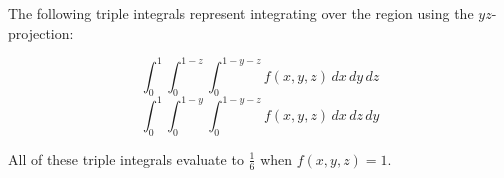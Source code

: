 \documentclass{amsart}
\newcommand{\ds}{\displaystyle}
\theoremstyle{definition}
\begin{document}
The following triple integrals represent integrating over the region using the $yz$-projection:

\[\int_{0}^{1}\int_{0}^{1-z}\int_{0}^{1-y-z} f(x,y,z) \,dx \,dy \,dz\]
\[\int_{0}^{1}\int_{0}^{1-y}\int_{0}^{1-y-z} f(x,y,z) \,dx \,dz \,dy\]

\vspace{1em}
All of these triple integrals evaluate to $\frac{1}{6}$ when $f(x,y,z) = 1$.

\end{document}
